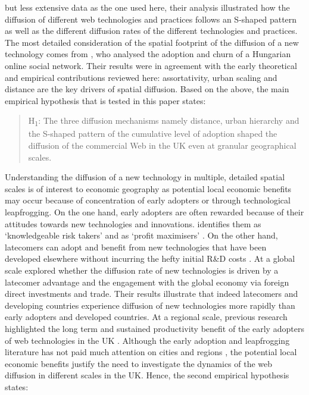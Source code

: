 \documentclass[
  authoryear,
  preprint,
  3p]{elsarticle}
\begin{document}
but less extensive data as the one used here, their analysis illustrated
how the diffusion of different web technologies and practices follows an
S-shaped pattern as well as the different diffusion rates of the
different technologies and practices. The most detailed consideration of
the spatial footprint of the diffusion of a new technology comes from
\citet{lengyel2020role}, who analysed the adoption and churn of a
Hungarian online social network. Their results were in agreement with
the early theoretical and empirical contributions reviewed here:
assortativity, urban scaling and distance are the key drivers of spatial
diffusion. Based on the above, the main empirical hypothesis that is
tested in this paper states:

\begin{quote}
H\textsubscript{1}: The three diffusion mechanisms namely distance,
urban hierarchy and the S-shaped pattern of the cumulative level of
adoption shaped the diffusion of the commercial Web in the UK even at
granular geographical scales.
\end{quote}

Understanding the diffusion of a new technology in multiple, detailed
spatial scales is of interest to economic geography as potential local
economic benefits may occur because of concentration of early adopters
or through technological leapfrogging. On the one hand, early adopters
are often rewarded because of their attitudes towards new technologies
and innovations. \citet{rogers2010diffusion} identifies them as
`knowledgeable risk takers' and \citet{griliches1957} as `profit
maximisers' \citep{ding2010modeling}. On the other hand, latecomers can
adopt and benefit from new technologies that have been developed
elsewhere without incurring the hefty initial R\&D costs
\citep{teece2008firm}. At a global scale
\citet{perkins2005international} explored whether the diffusion rate of
new technologies is driven by a latecomer advantage and the engagement
with the global economy via foreign direct investments and trade. Their
results illustrate that indeed latecomers and developing countries
experience diffusion of new technologies more rapidly than early
adopters and developed countries. At a regional scale, previous research
highlighted the long term and sustained productivity benefit of the
early adopters of web technologies in the UK \citep{tranosuk}. Although
the early adoption and leapfrogging literature has not paid much
attention on cities and regions \citep{yu2018sustainability}, the
potential local economic benefits justify the need to investigate the
dynamics of the web diffusion in different scales in the UK. Hence, the
second empirical hypothesis states:
\end{document}
